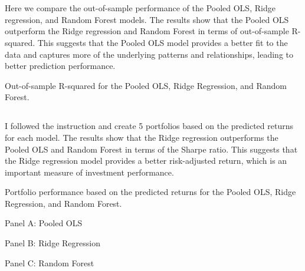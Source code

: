 \documentclass[hidelinks,12pt]{article}
\begin{document}
\section{}

\subsection{}
Here we compare the out-of-sample performance of the Pooled OLS, Ridge regression, and Random Forest models. The results show that the Pooled OLS outperform the Ridge regression and Random Forest in terms of out-of-sample R-squared. This suggests that the Pooled OLS model provides a better fit to the data and captures more of the underlying patterns and relationships, leading to better prediction performance. 
\begin{table}[htbp]
    \centering
    \caption{Out-of-sample R-squared for the Pooled OLS, Ridge Regression, and Random Forest.}
    \resizebox{!}{!}{}
\end{table}
\FloatBarrier
\subsection{}
I followed the instruction and create 5 portfolios based on the predicted returns for each model. The results show that the Ridge regression outperforms the Pooled OLS and Random Forest in terms of the Sharpe ratio. This suggests that the Ridge regression model provides a better risk-adjusted return, which is an important measure of investment performance.
\begin{table}[htbp]
    \centering
    \caption{Portfolio performance based on the predicted returns for the Pooled OLS, Ridge Regression, and Random Forest.}
    \caption*{\scriptsize\textmd{Panel A: Pooled OLS}}
    \resizebox{0.65\textwidth}{!}{}
    
    \vspace{0.5cm} %
    
    \caption*{\scriptsize\textmd{Panel B: Ridge Regression}}
    \resizebox{0.65\textwidth}{!}{}
    
    \vspace{0.5cm} %
    
    \caption*{\scriptsize\textmd{Panel C: Random Forest}}
    \resizebox{0.65\textwidth}{!}{}
\end{table}
\FloatBarrier
\end{document}
